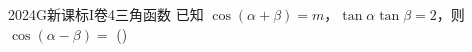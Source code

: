 
\begin{problem}{2024}{G}{新课标I卷}{4}{三角函数}
已知 $\cos(\alpha+\beta)=m$，$\tan\alpha\tan\beta=2$，则 $\cos(\alpha-\beta)=$
(\hspace{1cm})
\begin{choices}
\end{choices}
\end{problem}